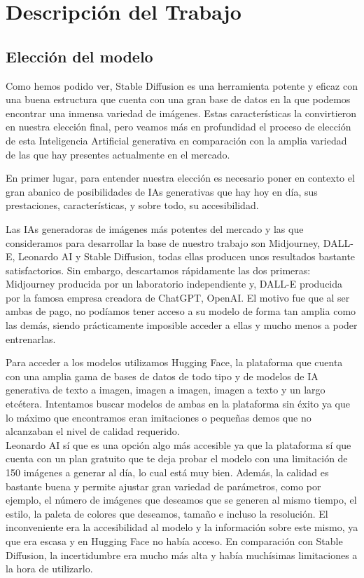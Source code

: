 \chapter{Descripción del Trabajo}
\label{cap:descripcionTrabajo}

\section{Elección del modelo}

Como hemos podido ver, Stable Diffusion es una herramienta potente y eficaz con una buena estructura que cuenta con una gran base de datos en la que podemos encontrar una inmensa variedad de imágenes. Estas características la convirtieron en nuestra elección final, pero veamos más en profundidad el proceso de elección de esta Inteligencia Artificial generativa en comparación con la amplia variedad de las que hay presentes actualmente en el mercado. 

En primer lugar, para entender nuestra elección es necesario poner en contexto el gran abanico de posibilidades de IAs generativas que hay hoy en día, sus prestaciones, características, y sobre todo, su accesibilidad. 

Las IAs generadoras de imágenes más potentes del mercado y las que consideramos para desarrollar la base de nuestro trabajo son Midjourney, DALL-E, Leonardo AI y Stable Diffusion, todas ellas producen unos resultados bastante satisfactorios. Sin embargo, descartamos rápidamente las dos primeras: Midjourney producida por un laboratorio independiente y,
DALL-E producida por la famosa empresa creadora de ChatGPT, OpenAI. El motivo fue que al ser ambas de pago, no podíamos tener acceso a su modelo de forma tan amplia como las demás, siendo prácticamente imposible acceder a ellas y mucho menos a poder entrenarlas. 

Para acceder a los modelos utilizamos Hugging Face, la plataforma  que cuenta con una amplia gama de bases de datos de todo tipo y de modelos de IA generativa de texto a imagen, imagen a imagen, imagen a texto y un largo etcétera. Intentamos buscar modelos de ambas en la plataforma sin éxito ya que lo máximo que encontramos eran imitaciones o pequeñas demos que no alcanzaban el nivel de calidad requerido. \\


Leonardo AI sí que es una opción algo más accesible ya que la plataforma sí que cuenta con un plan gratuito que te deja probar el modelo con una limitación de 150 imágenes a generar al día, lo cual está muy bien. Además, la calidad es bastante buena y permite ajustar gran variedad de parámetros, como por ejemplo, el número de imágenes que deseamos que se generen al mismo tiempo, el estilo, la paleta de colores que deseamos, tamaño e incluso la resolución. El inconveniente era la accesibilidad al modelo y la información sobre este mismo, ya que era escasa y en Hugging Face no había acceso. En comparación con Stable Diffusion, la incertidumbre era mucho más alta y había muchísimas limitaciones a la hora de utilizarlo. \\

